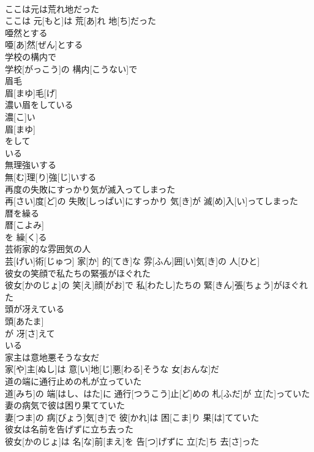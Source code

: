 \documentclass[8pt]{extreport}
\begin{document}
\begin{CJK}{UTF8}{min}
\\	ここは元は荒れ地だった	
\\	ここは 元[もと]は 荒[あ]れ 地[ち]だった
\\	唖然とする	
\\	唖[あ]然[ぜん]とする
\\	学校の構内で	
\\	学校[がっこう]の 構内[こうない]で
\\	眉毛	
\\	眉[まゆ]毛[げ]
\\	濃い眉をしている	
\\	濃[こ]い 
\\	眉[まゆ]
\\	をして 
\\	いる 
\\	無理強いする	
\\	無[む]理[り]強[じ]いする
\\	再度の失敗にすっかり気が滅入ってしまった	
\\	再[さい]度[ど]の 失敗[しっぱい]にすっかり 気[き]が 滅[め]入[い]ってしまった
\\	暦を繰る	
\\	暦[こよみ]
\\	を 繰[く]る 
\\	芸術家的な雰囲気の人	
\\	芸[げい]術[じゅつ] 家[か] 的[てき]な 雰[ふん]囲[い]気[き]の 人[ひと]
\\	彼女の笑顔で私たちの緊張がほぐれた	
\\	彼女[かのじょ]の 笑[え]顔[がお]で 私[わたし]たちの 緊[きん]張[ちょう]がほぐれた
\\	頭が冴えている	
\\	頭[あたま]
\\	が 冴[さ]えて 
\\	いる
\\	家主は意地悪そうな女だ	
\\	家[や]主[ぬし]は 意[い]地[じ]悪[わる]そうな 女[おんな]だ
\\	道の端に通行止めの札が立っていた	
\\	道[みち]の 端[はし、はた]に 通行[つうこう]止[ど]めの 札[ふだ]が 立[た]っていた
\\	妻の病気で彼は困り果てていた	
\\	妻[つま]の 病[びょう]気[き]で 彼[かれ]は 困[こま]り 果[は]てていた
\\	彼女は名前を告げずに立ち去った	
\\	彼女[かのじょ]は 名[な]前[まえ]を 告[つ]げずに 立[た]ち 去[さ]った

\end{CJK}
\end{document}
